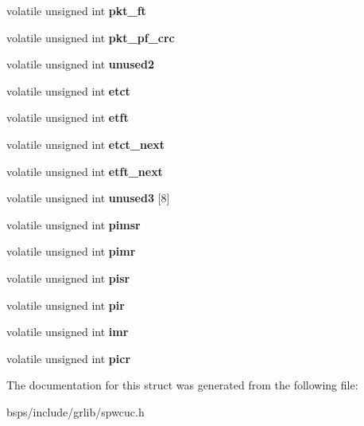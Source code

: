 \begin{DoxyCompactItemize}
\mbox{\label{structspwcuc__regs_adff41063c6fae6b229bd9f72157c55cf}} 
volatile unsigned int {\bfseries pkt\+\_\+ft}
\item 
\mbox{\label{structspwcuc__regs_a79f919a40c45c505db1d2fff7eddfa47}} 
volatile unsigned int {\bfseries pkt\+\_\+pf\+\_\+crc}
\item 
\mbox{\label{structspwcuc__regs_a5d404cd5991014bb16d2326a3317deb1}} 
volatile unsigned int {\bfseries unused2}
\item 
\mbox{\label{structspwcuc__regs_aa4579dbad5c36602605aac2e901c312f}} 
volatile unsigned int {\bfseries etct}
\item 
\mbox{\label{structspwcuc__regs_a283cb453356d764c63d129707fb0baf6}} 
volatile unsigned int {\bfseries etft}
\item 
\mbox{\label{structspwcuc__regs_a000dff2b1e8ed442afe2cfcc91722151}} 
volatile unsigned int {\bfseries etct\+\_\+next}
\item 
\mbox{\label{structspwcuc__regs_a4d52b9e6f7e7558642e251066b3ea61b}} 
volatile unsigned int {\bfseries etft\+\_\+next}
\item 
\mbox{\label{structspwcuc__regs_a6e77011d1c0bbabf902661ba6067fb1f}} 
volatile unsigned int {\bfseries unused3} \mbox{[}8\mbox{]}
\item 
\mbox{\label{structspwcuc__regs_a980eaa78ab8e883ac0ebba8bb3ca5bf1}} 
volatile unsigned int {\bfseries pimsr}
\item 
\mbox{\label{structspwcuc__regs_a0107ca37061f86dbd8abf1d8e5afcd80}} 
volatile unsigned int {\bfseries pimr}
\item 
\mbox{\label{structspwcuc__regs_a9f61363cc744cb042e6408042d8702d8}} 
volatile unsigned int {\bfseries pisr}
\item 
\mbox{\label{structspwcuc__regs_a9a5a4a9403151f0207dbaefc00efd2ee}} 
volatile unsigned int {\bfseries pir}
\item 
\mbox{\label{structspwcuc__regs_ac6fa15a6cfff7e787a85fc25ce453ccc}} 
volatile unsigned int {\bfseries imr}
\item 
\mbox{\label{structspwcuc__regs_a052fbec30d3734a1028d96dc761e3e09}} 
volatile unsigned int {\bfseries picr}
\end{DoxyCompactItemize}


The documentation for this struct was generated from the following file\+:\begin{DoxyCompactItemize}
\item 
bsps/include/grlib/spwcuc.\+h\end{DoxyCompactItemize}
